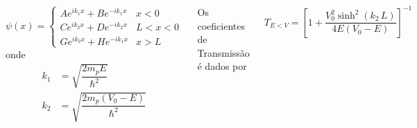 \documentclass[12pt,brazil,table]{beamer}
\begin{document}
\begin{frame}
\begin{minipage}[b][20ex][t]{\linewidth}
\begin{columns}
      \[
      \psi(x) = \begin{cases}
                  Ae^{ik_1x}+Be^{-ik_1x}& x < 0\\
                  Ce^{ik_2x}+De^{-ik_2x}& L < x < 0\\
                  Ge^{ik_2x}+He^{-ik_1x}& x > L
                \end{cases}
        \]
        onde        
        \begin{align*}
            k_1 &= \sqrt{\dfrac{2m_pE}{\hbar^2}}\\
            k_2 &= \sqrt{\dfrac{2m_p\left(  V_0 - E \right)}{\hbar^2}}
          \end{align*}
        
        
        Os coeficientes de Transmissão é dados por
        
        \[
         T_{E<V}= \left[1 + \dfrac{V_0^2\sinh^2 \left(k_2\,L \right)}{4E\left(V_0-E\right)}\right]^{-1}
        \]

      
        \end{columns}
    \end{minipage}


\end{frame}


  
\end{document}
